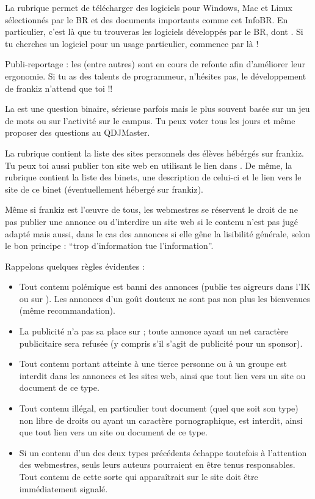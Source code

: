 La rubrique  permet de t\'el\'echarger des logiciels pour Windows, Mac et Linux
s\'electionn\'es par le BR et des documents importants comme cet InfoBR.
En particulier, c'est l\`a que tu trouveras les logiciels d\'evelopp\'es par le BR, dont .
Si tu cherches un logiciel pour un usage particulier, commence par l\`a !

Publi-reportage : les  (entre autres) sont en cours de refonte
afin d'am\'eliorer leur ergonomie.
Si tu as des talents de programmeur, n'h\'esites pas, le d\'eveloppement de frankiz n'attend que toi !!

La  est une question binaire, s\'erieuse parfois mais le plus souvent bas\'ee sur un jeu de mots
ou sur l'activit\'e sur le campus.
Tu peux voter tous les jours et m\^eme proposer des questions au QDJMaster.

La rubrique  contient la liste des sites personnels des \'el\`eves h\'eb\'erg\'es sur frankiz.
Tu peux toi aussi publier ton site web en utilisant le lien dans .
De m\^eme, la rubrique  contient la liste des binets, une description de celui-ci
et le lien vers le site de ce binet (\'eventuellement h\'eberg\'e sur frankiz).

M\^eme si frankiz est l'\oe uvre de tous, les webmestres se r\'eservent le droit de ne pas publier une annonce
ou d'interdire un site web si le contenu n'est pas jug\'e adapt\'e mais aussi,
dans le cas des annonces si elle g\^ene la lisibilit\'e g\'en\'erale, selon le bon principe :
``trop d'information tue l'information''.

Rappelons quelques r\`egles \'evidentes :
\begin{itemize}
 \item Tout contenu pol\'emique est banni des annonces (publie tes aigreurs dans l'IK ou sur ).
       Les annonces d'un go\^ut douteux ne sont pas non plus les bienvenues (m\^eme recommandation).
 \item La publicit\'e n'a pas sa place sur \fkz ; toute annonce ayant un net caract\`ere publicitaire
       sera refus\'ee (y compris s'il s'agit de publicit\'e pour un sponsor).
 \item Tout contenu portant atteinte \`a une tierce personne ou \`a un groupe est interdit dans les annonces
       et les sites web, ainsi que tout lien vers un site ou document de ce type.
 \item Tout contenu ill\'egal, en particulier tout document (quel que soit son type)
       non libre de droits ou ayant un caract\`ere pornographique, est interdit,
       ainsi que tout lien vers un site ou document de ce type.
 \item Si un contenu d'un des deux types pr\'ec\'edents \'echappe toutefois \`a l'attention des webmestres,
       seuls leurs auteurs pourraient en \^etre tenus responsables.
       Tout contenu de cette sorte qui appara\^itrait sur le site doit \^etre imm\'ediatement signal\'e.
\end{itemize}

